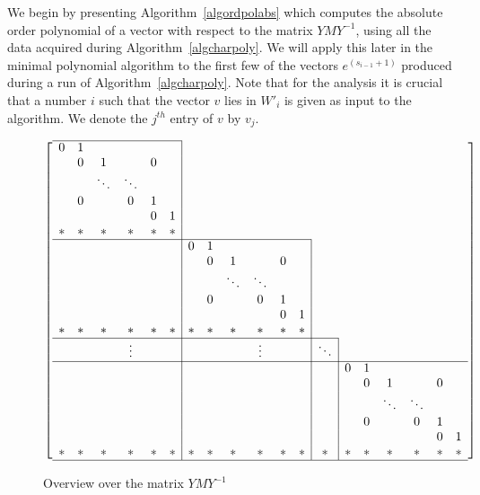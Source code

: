 We begin by presenting Algorithm~\ref{algordpolabs} which computes the
absolute order polynomial of a vector with respect to the matrix $YMY^{-1}$,
using all the data acquired during Algorithm~\ref{algcharpoly}. 
We will apply this later
in the minimal polynomial algorithm to the first few of the vectors 
$e^{(s_{i-1}+1)}$ 
produced during a run of Algorithm~\ref{algcharpoly}. Note that for 
the analysis it is crucial that a number $i$ such that
the vector $v$ lies in $W'_i$ is given as input to the algorithm.
We denote the $j^{th}$ entry of $v$ by $v_j$.

\begin{figure}
\caption{Overview over the matrix $YMY^{-1}$}
\label{bigmat}
\[ \left[ \begin{array}{cccccc|cccccc|c|cccccc}
\cline{1-6}
  0 & 1 &      &      &   &   \\
    & 0 & 1    &      & 0 &   \\
    &   &\ddots&\ddots&   &   \\
    & 0 &      &   0  & 1 &   \\
    &   &      &      & 0 & 1 \\
  {}* & * &   *  &   *  & * & * \\
\cline{1-12}
  &&&&&& 0 & 1 &      &      &   &   \\
  &&&&&&  & 0 & 1    &      & 0 &   \\
  &&&&&&  &   &\ddots&\ddots&   &   \\
  &&&&&&  & 0 &      &   0  & 1 &   \\
  &&&&&&  &   &      &      & 0 & 1 \\
  {}*&*&*&*&*&*&* & * &   *  &   *  & * & * \\
\cline{1-13}
  &&&\vdots&&& &&&\vdots&&& \ddots \\
\cline{1-19}
  &&&&&& &&&&&& & 0 & 1 &      &      &   &   \\
  &&&&&& &&&&&& & & 0 & 1    &      & 0 &   \\
  &&&&&& &&&&&& & &   &\ddots&\ddots&   &   \\
  &&&&&& &&&&&& & & 0 &      &   0  & 1 &   \\
  &&&&&& &&&&&& & &   &      &      & 0 & 1 \\
  {}*&*&*&*&*&*& *&*&*&*&*&*&* &*& * &   *  &   *  & * & * \\
\hline
\end{array} \right] \]
\end{figure}

